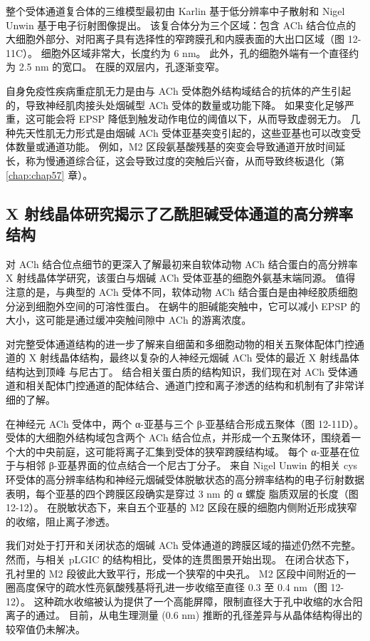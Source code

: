 整个受体通道复合体的三维模型最初由 Karlin 基于低分辨率中子散射和 Nigel Unwin 基于电子衍射图像提出。 
该复合体分为三个区域：包含 ACh 结合位点的大细胞外部分、对阳离子具有选择性的窄跨膜孔和内膜表面的大出口区域（图 12-11C）。 
细胞外区域非常大，长度约为 6 nm。 
此外，孔的细胞外端有一个直径约为 2.5 nm 的宽口。 
在膜的双层内，孔逐渐变窄。


自身免疫性疾病重症肌无力是由与 ACh 受体胞外结构域结合的抗体的产生引起的，导致神经肌肉接头处烟碱型 ACh 受体的数量或功能下降。 
如果变化足够严重，这可能会将 EPSP 降低到触发动作电位的阈值以下，从而导致虚弱无力。 
几种先天性肌无力形式是由烟碱 ACh 受体亚基突变引起的，这些亚基也可以改变受体数量或通道功能。 
例如，M2 区段氨基酸残基的突变会导致通道开放时间延长，称为慢通道综合征，这会导致过度的突触后兴奋，从而导致终板退化（第 \ref{chap:chap57} 章）。



\subsection{X 射线晶体研究揭示了乙酰胆碱受体通道的高分辨率结构}

对 ACh 结合位点细节的更深入了解最初来自软体动物 ACh 结合蛋白的高分辨率 X 射线晶体学研究，该蛋白与烟碱 ACh 受体亚基的细胞外氨基末端同源。 
值得注意的是，与典型的 ACh 受体不同，软体动物 ACh 结合蛋白是由神经胶质细胞分泌到细胞外空间的可溶性蛋白。 
在蜗牛的胆碱能突触中，它可以减小 EPSP 的大小，这可能是通过缓冲突触间隙中 ACh 的游离浓度。


对完整受体通道结构的进一步了解来自细菌和多细胞动物的相关五聚体配体门控通道的 X 射线晶体结构，最终以复杂的人神经元烟碱 ACh 受体的最近 X 射线晶体结构达到顶峰 与尼古丁。 
结合相关蛋白质的结构知识，我们现在对 ACh 受体通道和相关配体门控通道的配体结合、通道门控和离子渗透的结构和机制有了非常详细的了解。


在神经元 ACh 受体中，两个 α-亚基与三个 β-亚基结合形成五聚体（图 12-11D）。 
受体的大细胞外结构域包含两个 ACh 结合位点，并形成一个五聚体环，围绕着一个大的中央前庭，这可能将离子汇集到受体的狭窄跨膜结构域。 
每个 α-亚基在位于与相邻 β-亚基界面的位点结合一个尼古丁分子。 
来自 Nigel Unwin 的相关 cys 环受体的高分辨率结构和神经元烟碱受体脱敏状态的高分辨率结构的电子衍射数据表明，每个亚基的四个跨膜区段确实是穿过 3 nm 的 α 螺旋 脂质双层的长度（图 12-12）。 
在脱敏状态下，来自五个亚基的 M2 区段在膜的细胞内侧附近形成狭窄的收缩，阻止离子渗透。


我们对处于打开和关闭状态的烟碱 ACh 受体通道的跨膜区域的描述仍然不完整。 
然而，与相关 pLGIC 的结构相比，受体的连贯图景开始出现。 
在闭合状态下，孔衬里的 M2 段彼此大致平行，形成一个狭窄的中央孔。 
M2 区段中间附近的一圈高度保守的疏水性亮氨酸残基将孔进一步收缩至直径 0.3 至 0.4 nm（图 12-12）。 
这种疏水收缩被认为提供了一个高能屏障，限制直径大于孔中收缩的水合阳离子的通过。 
目前，从电生理测量 (0.6 nm) 推断的孔径差异与从晶体结构得出的较窄值仍未解决。



